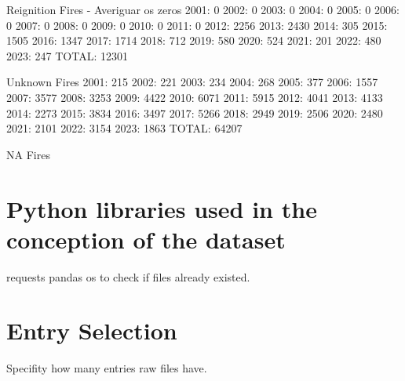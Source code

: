 Reignition Fires - Averiguar os zeros
2001: 0
2002: 0
2003: 0
2004: 0
2005: 0
2006: 0
2007: 0
2008: 0
2009: 0
2010: 0
2011: 0
2012: 2256
2013: 2430
2014: 305
2015: 1505
2016: 1347
2017: 1714
2018: 712
2019: 580
2020: 524
2021: 201
2022: 480
2023: 247
TOTAL: 12301

Unknown Fires
2001: 215
2002: 221
2003: 234
2004: 268
2005: 377
2006: 1557
2007: 3577
2008: 3253
2009: 4422
2010: 6071
2011: 5915
2012: 4041
2013: 4133
2014: 2273
2015: 3834
2016: 3497
2017: 5266
2018: 2949
2019: 2506
2020: 2480
2021: 2101
2022: 3154
2023: 1863
TOTAL: 64207

NA Fires





\section{Python libraries used in the conception of the dataset}
requests
pandas
os to check if files already existed.




\section{Entry Selection}
Specifity how many entries raw files have.
